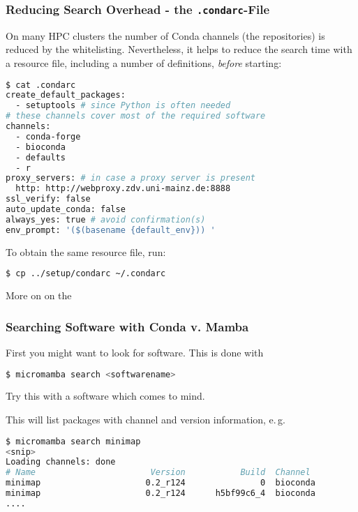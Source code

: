 \begin{frame}[fragile]
  \frametitle{Reducing Search Overhead - the \texttt{.condarc}-File}
  On many HPC clusters the number of Conda channels (the repositories) is reduced by the whitelisting. Nevertheless, it helps to reduce the search time with a resource file, including  a number of definitions, \emph{before} starting:
  \begin{lstlisting}[language=Bash, style=Shell, basicstyle=\tiny]
$ cat .condarc
create_default_packages:
  - setuptools # since Python is often needed
# these channels cover most of the required software
channels:
  - conda-forge
  - bioconda
  - defaults
  - r
proxy_servers: # in case a proxy server is present
  http: http://webproxy.zdv.uni-mainz.de:8888
ssl_verify: false
auto_update_conda: false
always_yes: true # avoid confirmation(s)
env_prompt: '($(basename {default_env})) '
  \end{lstlisting}
  To obtain the same resource file, run:
  \begin{lstlisting}[language=Bash, style=Shell, basicstyle=\footnotesize]
$ cp ../setup/condarc ~/.condarc
  \end{lstlisting}
  More on  on the 
\end{frame}

\begin{frame}[fragile]
  \frametitle{Searching Software with Conda v. Mamba}
  First you might want to look for software. This is done with
  \begin{lstlisting}[language=Bash, style=Shell]
$ micromamba search <softwarename>
  \end{lstlisting}
  \pause
  \begin{task}
  	Try this with a software which comes to mind.
  \end{task}
  \pause
  This will list packages with channel and version information, e.\,g.
  \begin{lstlisting}[language=Bash, style=Shell, basicstyle=\tiny]
$ micromamba search minimap
<snip>
Loading channels: done
# Name                       Version           Build  Channel             
minimap                     0.2_r124               0  bioconda            
minimap                     0.2_r124      h5bf99c6_4  bioconda
....
  \end{lstlisting}
\end{frame}



